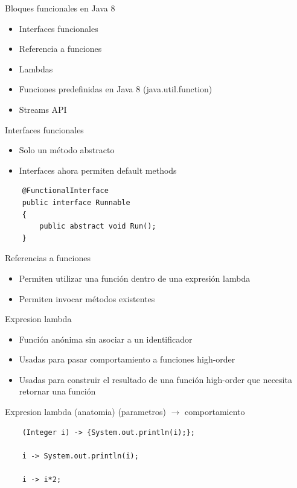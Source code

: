 \documentclass{beamer}
\begin{document}
\begin{frame}{Bloques funcionales en Java 8}
	\begin{itemize}
	\item Interfaces funcionales
	\item Referencia a funciones
	\item Lambdas
	\item Funciones predefinidas en Java 8 (java.util.function)
	\item Streams API
	\end{itemize}
\end{frame}

\begin{frame}[fragile]{Interfaces funcionales}
	\begin{itemize}
	\item Solo un método abstracto
	\item Interfaces ahora permiten default methods
	\end{itemize}
	\begin{lstlisting}
	@FunctionalInterface
	public interface Runnable
	{
		public abstract void Run();
	}
	\end{lstlisting}
\end{frame}

\begin{frame}{Referencias a funciones}
	\begin{itemize}
	\item Permiten utilizar una función dentro de una expresión lambda
	\item Permiten invocar métodos existentes
	\end{itemize}
\end{frame}

\begin{frame}{Expresion lambda}
	\begin{itemize}
	\item Función anónima sin asociar a un identificador
	\item Usadas para pasar comportamiento a funciones high-order
	\item Usadas para construir el resultado de una función high-order que necesita retornar una función
	\end{itemize}
\end{frame}

\begin{frame}[fragile]{Expresion lambda (anatomia)}
	(parametros)  $\to$ {comportamiento}
	
	\begin{lstlisting}
	(Integer i) -> {System.out.println(i);};
		
	i -> System.out.println(i);
	    
	i -> i*2;
	\end{lstlisting}
\end{frame}
\end{document}
